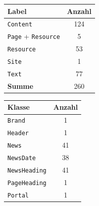     \begin{table}[htb]
        \begin{subtable}[c]{0.3\textwidth}
            \centering
            \begin{tabular}{|l|c|}
                \hline
                \textbf{Label}  & \multicolumn{1}{l|}{\textbf{Anzahl}} \\ \hline
                \texttt{Content}         & 124                                  \\ \hline
                \texttt{Page} + \texttt{Resource} & 5                                    \\ \hline
                \texttt{Resource}        & 53                                   \\ \hline
                \texttt{Site}            & 1                                    \\ \hline
                \texttt{Text}            & 77                                   \\ \hline
                \hline
                \textbf{Summe}  & 260                                  \\ \hline
            \end{tabular}
            \label{table:findingsNewsFiguresNodesByLabel}
        \end{subtable}
        \begin{subtable}[c]{0.3\textwidth}
            \centering
            \begin{tabular}{|l|c|}
                \hline
                \textbf{Klasse} & \multicolumn{1}{l|}{\textbf{Anzahl}} \\ \hline
                \texttt{Brand}           & 1                                    \\ \hline
                \texttt{Header}          & 1                                    \\ \hline
                \texttt{News}            & 41                                   \\ \hline
                \texttt{NewsDate}        & 38                                   \\ \hline
                \texttt{NewsHeading}     & 41                                   \\ \hline
                \texttt{PageHeading}     & 1                                    \\ \hline
                \texttt{Portal}          & 1                                    \\ \hline

\end{tabular}
\end{subtable}
\end{table}
